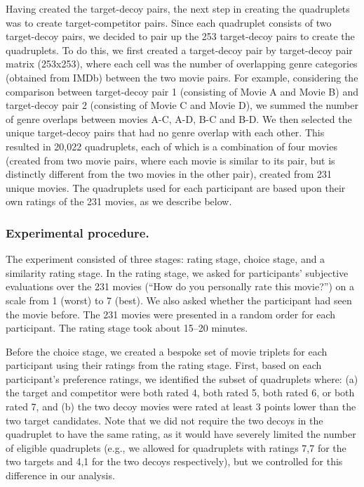 \documentclass[12pt, a4paper]{article}
\begin{document}
Having created the target-decoy pairs, the next step in creating the quadruplets was to create target-competitor pairs. Since each quadruplet consists of two target-decoy pairs, we decided to pair up the 253 target-decoy pairs to create the quadruplets. To do this, we first created a target-decoy pair by target-decoy pair matrix (253x253), where each cell was the number of overlapping genre categories (obtained from IMDb) between the two movie pairs. For example, considering the comparison between target-decoy pair 1 (consisting of Movie A and Movie B) and target-decoy pair 2 (consisting of Movie C and Movie D), we summed the number of genre overlaps between movies A-C, A-D, B-C and B-D. We then selected the unique target-decoy pairs that had no genre overlap with each other. This resulted in 20,022 quadruplets, each of which is a combination of four movies (created from two movie pairs, where each movie is similar to its pair, but is distinctly different from the two movies in the other pair), created from 231 unique movies. The quadruplets used for each participant are based upon their own ratings of the 231 movies, as we describe below.

\subsubsection*{Experimental procedure.}

The experiment consisted of three stages: rating stage, choice stage, and a similarity rating stage. In the rating stage, we asked for participants' subjective evaluations over the 231 movies (``How do you personally rate this movie?'') on a scale from 1 (worst) to 7 (best). We also asked whether the participant had seen the movie before. The 231 movies were presented in a random order for each participant. The rating stage took about 15--20 minutes.

Before the choice stage, we created a bespoke set of movie triplets for each participant using their ratings from the rating stage. First, based on each participant's preference ratings, we identified the subset of quadruplets where: (a) the target and competitor were both rated 4, both rated 5, both rated 6, or both rated 7, and (b) the two decoy movies were rated at least 3 points lower than the two target candidates. Note that we did not require the two decoys in the quadruplet to have the same rating, as it would have severely limited the number of eligible quadruplets (e.g., we allowed for quadruplets with ratings 7,7 for the two targets and 4,1 for the two decoys respectively), but we controlled for this difference in our analysis.
\end{document}
